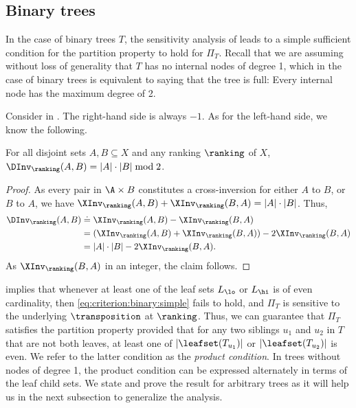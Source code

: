 \subsection{Binary trees}
\label{sec:connectivity:binary}

In the case of binary trees $T$, the sensitivity analysis of  leads to a simple sufficient condition for the partition property to hold for $\Pi_T$.
Recall that we are assuming without loss of generality that $T$ has no internal nodes of degree 1, which in the case of binary trees is equivalent to saying that the tree is full: Every internal node has the maximum degree of 2. 

Consider  in . The right-hand side is always $-1$. As for the left-hand side, we know the following.
\begin{fact}\label{fact:DInv:parity}
For all disjoint sets $A, B \subseteq X$ and any ranking $\ranking$ of $X$, $\DInv_\ranking(A,B) = |A| \cdot |B| \bmod 2$. 
\end{fact}
\begin{proof}
As every pair in $\A \times B$ constitutes a cross-inversion for either $A$ to $B$, or $B$ to $A$, we have 
$\XInv_\ranking(A,B) + \XInv_\ranking(B,A) = |A| \cdot |B|$.
%
Thus,
\begin{align}
\DInv_\ranking(A,B) 
& \doteq  \XInv_\ranking(A,B) - \XInv_\ranking(B,A) \nonumber \\
& = (\XInv_\ranking(A,B) + \XInv_\ranking(B,A)) - 2 \XInv_\ranking(B,A) \nonumber \\
& = |A| \cdot |B| - 2 \XInv_\ranking(B,A). \label{eq:DInv:as:XInv}
\end{align}
As $\XInv_\ranking(B,A)$ in an integer, the claim follows.
\end{proof}
 implies that whenever at least one of the leaf sets $L_\lo$ or $L_\hi$ is of even cardinality, then \eqref{eq:criterion:binary:simple} fails to hold, and $\Pi_T$ is sensitive to the underlying $\transposition$ at $\ranking$. Thus, we can guarantee that $\Pi_T$ satisfies the partition property provided that for any two siblings $u_1$ and $u_2$ in $T$ that are not both leaves, at least one of $\lvert\leafset(T_{u_1})\rvert$ or $\lvert\leafset(T_{u_2})\rvert$ is even. We refer to the latter condition as the \emph{product condition}. In trees without nodes of degree 1, the product condition can be expressed alternately in terms of the leaf child sets. We state and prove the result for arbitrary trees as it will help us in the next subsection to generalize the analysis.
